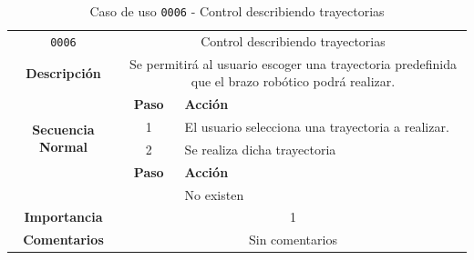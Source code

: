 \begin{table}[H]
    \centering
    \begin{tabularx}{\textwidth}{|c|c|X|}
        \cline{1-3}
        \texttt{0006}        & \multicolumn{2}{c|}{Control describiendo trayectorias}                                      
        \\ \cline{1-3}
        \textbf{Descripción} & \multicolumn{2}{m{13cm}|}{Se permitirá al usuario escoger una trayectoria predefinida que el brazo robótico podrá realizar.}
        \\ \cline{1-3}
        \multirow{4}{*}{\textbf{Secuencia Normal}} & \textbf{Paso} & \textbf{Acción}
        \\ \cline{2-3}                    &   1  & El usuario selecciona una trayectoria a realizar.
        \\ \cline{2-3}                    &   2  & Se realiza dicha trayectoria
        \\ \cline{1-3}
        \multirow{2}{*}{\textbf{Excepciones}} & \textbf{Paso} & \textbf{Acción}
        \\ \cline{2-3}                    &      &  No existen
        \\ \cline{1-3}
        \textbf{Importancia}                 & \multicolumn{2}{c|}{1}           
        \\ \cline{1-3}
        \textbf{Comentarios}                 & \multicolumn{2}{c|}{Sin comentarios}
        \\ \cline{1-3}
    \end{tabularx}
    \caption{Caso de uso \texttt{0006} - Control describiendo trayectorias}
\end{table}

